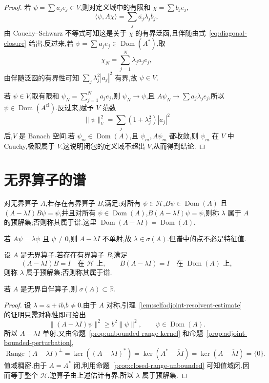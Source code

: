 \begin{proof}
若 \(\psi=\sum a_{j}e_{j}\in V\),则对定义域中的有限和 \(\chi=\sum b_{j}e_{j}\),
\[
\langle\psi,A\chi\rangle=\sum_{j}\overline{a_{j}}\lambda_{j}b_{j},
\]
由 Cauchy--Schwarz 不等式可知这是关于 \(\chi\) 的有界泛函,且伴随由式~\eqref{eq:diagonal-closure} 给出.反过来,若 \(\psi=\sum a_{j}e_{j}\in\operatorname{Dom}(A^{*})\),取
\[
\chi_{N}=\sum_{j=1}^{N}\lambda_{j}a_{j}e_{j},
\]
由伴随泛函的有界性可知 \(\sum_{j}\lambda_{j}^{2}|a_{j}|^{2}\) 有界,故 \(\psi\in V\).

若 \(\psi\in V\),取有限和 \(\psi_{N}=\sum_{j=1}^{N}a_{j}e_{j}\),则 \(\psi_{N}\to\psi\),且 \(A\psi_{N}\to\sum a_{j}\lambda_{j}e_{j}\),所以 \(\psi\in\operatorname{Dom}(A^{\mathrm{cl}})\).反过来,赋予 \(V\) 范数
\[
\|\psi\|_{V}^{2}=\sum_{j}(1+\lambda_{j}^{2})|a_{j}|^{2}
\]
后,\(V\) 是 Banach 空间.若 \(\psi_{m}\in\operatorname{Dom}(A)\),且 \(\psi_{m},A\psi_{m}\) 都收敛,则 \(\psi_{m}\) 在 \(V\) 中 Cauchy,极限属于 \(V\).这说明闭包的定义域不超出 \(V\),从而得到结论.
\end{proof}

\section{无界算子的谱}
\label{sec:unbounded-spectrum}

对无界算子 \(A\),若存在有界算子 \(B\),满足:对所有 \(\psi\in\mathcal{H}\),\(B\psi\in\operatorname{Dom}(A)\) 且 \((A-\lambda I)B\psi=\psi\),并且对所有 \(\psi\in\operatorname{Dom}(A)\),\(B(A-\lambda I)\psi=\psi\),则称 \(\lambda\) 属于 \(A\) 的预解集;否则称其属于谱.这里 \(\operatorname{Dom}(A-\lambda I)=\operatorname{Dom}(A)\).

若 \(A\psi=\lambda\psi\) 且 \(\psi\neq0\),则 \(A-\lambda I\) 不单射,故 \(\lambda\in\sigma(A)\).但谱中的点不必是特征值.

\begin{definition}[无界算子的谱与预解集]\label{def:unbounded-spectrum}
设 \(A\) 是无界算子.若存在有界算子 \(B\),满足
\[
(A-\lambda I)B=I\quad\text{在 }\mathcal{H}\text{ 上},
\qquad
B(A-\lambda I)=I\quad\text{在 }\operatorname{Dom}(A)\text{ 上},
\]
则称 \(\lambda\) 属于预解集;否则称其属于谱.
\end{definition}

\begin{theorem}[自伴算子的谱为实数]\label{thm:unbounded-selfadjoint-real-spectrum}
若 \(A\) 是无界自伴算子,则 \(\sigma(A)\subset\mathbb{R}\).
\end{theorem}

\begin{proof}
设 \(\lambda=a+ib\),\(b\neq0\).由于 \(A\) 对称,引理~\ref{lem:selfadjoint-resolvent-estimate} 的证明只需对称性即可给出
\[
\|(A-\lambda I)\psi\|^{2}\geq b^{2}\|\psi\|^{2},\qquad \psi\in\operatorname{Dom}(A).
\]
所以 \(A-\lambda I\) 单射.又由命题~\ref{prop:unbounded-range-kernel} 和命题~\ref{prop:adjoint-bounded-perturbation},
\[
\operatorname{Range}(A-\lambda I)^{\perp}
=\ker((A-\lambda I)^{*})
=\ker(A^{*}-\overline{\lambda}I)
=\ker(A-\overline{\lambda}I)=\{0\}.
\]
值域稠密.由于 \(A=A^{*}\) 闭,利用命题~\ref{prop:closed-range-unbounded} 可知值域闭,因而等于整个 \(\mathcal{H}\).逆算子由上述估计有界,所以 \(\lambda\) 属于预解集.
\end{proof}


